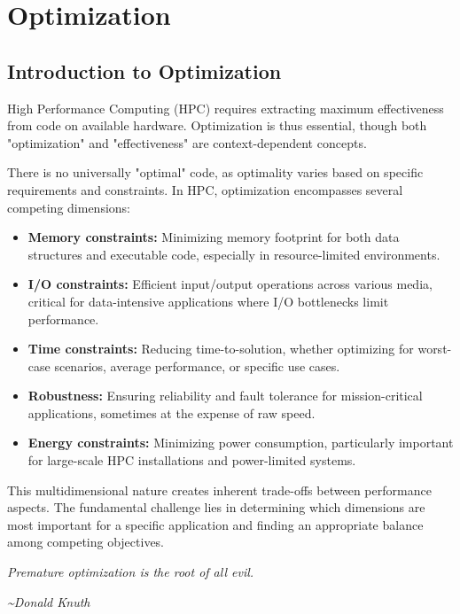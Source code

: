 \chapter{Optimization}

\section{Introduction to Optimization}

High Performance Computing (HPC) requires extracting maximum effectiveness from code on available hardware. Optimization is thus essential, though both "optimization" and "effectiveness" are context-dependent concepts.

There is no universally "optimal" code, as optimality varies based on specific requirements and constraints. In HPC, optimization encompasses several competing dimensions:

\begin{itemize}
    \item \textbf{Memory constraints:} Minimizing memory footprint for both data structures and executable code, especially in resource-limited environments.
    
    \item \textbf{I/O constraints:} Efficient input/output operations across various media, critical for data-intensive applications where I/O bottlenecks limit performance.
    
    \item \textbf{Time constraints:} Reducing time-to-solution, whether optimizing for worst-case scenarios, average performance, or specific use cases.
    
    \item \textbf{Robustness:} Ensuring reliability and fault tolerance for mission-critical applications, sometimes at the expense of raw speed.
    
    \item \textbf{Energy constraints:} Minimizing power consumption, particularly important for large-scale HPC installations and power-limited systems.
\end{itemize}

This multidimensional nature creates inherent trade-offs between performance aspects. The fundamental challenge lies in determining which dimensions are most important for a specific application and finding an appropriate balance among competing objectives.

\begin{tipsblock}
    \begin{center}
    \textit{Premature optimization is the root of all evil.}
    \end{center}
    \phantom{ } \hfill \textit{\textasciitilde Donald Knuth}
\end{tipsblock}

